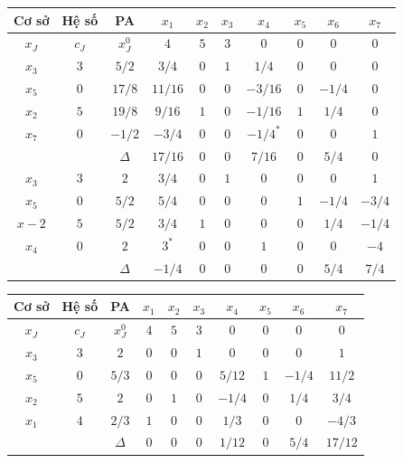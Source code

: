 \documentclass[12pt,a4paper]{report}
\begin{document}
    \begin{center}
        \begin{tabular}{|c|c|c|c|c|c|c|c|c|c|}
        \hline
         Cơ sở & Hệ số & PA& $x_1$ &$x_2$ &$x_3$ &$x_4$ &$x_5$ &$x_6$ &$x_7$ \\
         \hline
          $x_J$& $c_J$ &$x_J^0$ &$4$ &$5$ &$ 3$ &$0$ &$0$ &$0$ &$0$\\
          \hline
           $x_3$ &$3$ &$5/2$ &$3/4$ &$0$ &$1$ &$1/4$ &$0$ &$0$ &$0$\\
          $x_5$ &$0$ &$17/8$ &$11/16$ &$0$ &$0$ &$-3/16$ &$0$ &$-1/4$ &$0$\\
          $x_2$ &$5$ &$19/8$ &$9/16$ &$1$ &$0$ &$-1/16$ &$1$ &$1/4$ &$0$\\
          $x_7$ &$0$ &$-1/2$ &$-3/4$ &$0$ &$0$ &$-1/4^*$ &$0$ &$0$ &$1$\\
          \hline
          &&$\Delta$ &$17/16$ &$0$ &$0$ &$7/16$ &$0$ &$5/4$ &$0$\\
          \hline
          $x_3$ &$3$ &$2$ &$3/4$ &$0$ &$1$ &$0$ &$0$ &$0$ &$1$\\
          $x_5$ &$0$ &$5/2$ &$5/4$ &$0$ &$0$ &$0$ &$1$ &$-1/4$ &$-3/4$\\
          $x-2$ &$5$ &$5/2$ &$3/4$ &$1$ &$0$ &$0$ &$0$ &$1/4$ &$-1/4$\\
          $x_4$ &$0$ &$2$ &$3^*$ &$0$ &$0$ &$1$ &$0$ &$0$ &$-4$\\
          \hline
          &&$\Delta$&$-1/4$ &$0$ &$0$ &$0$ &$0$ &$5/4$ &$7/4$\\
          \hline
          \end{tabular}
    \end{center}    
    \begin{center}
        \begin{tabular}{|c|c|c|c|c|c|c|c|c|c|}
        \hline
          Cơ sở & Hệ số & PA& $x_1$ &$x_2$ &$x_3$ &$x_4$ &$x_5$ &$x_6$ &$x_7$ \\
         \hline
          $x_J$& $c_J$ &$x_J^0$ &$4$ &$5$ &$ 3$ &$0$ &$0$ &$0$ &$0$\\
          \hline
          $x_3$ &$3$ &$2$ &$0$ &$0$ &$1$ &$0$ &$0$ &$0$ &$1$\\
          $x_5$ &$0$ &$5/3$ &$0$ &$0$ &$0$ &$5/12$ &$1$ &$-1/4$ &$11/2$\\
          $x_2$ &$5$ &$2$ &$0$ &$1$ &$0$ &$-1/4$ &$0$ &$1/4$ &$3/4$\\
          $x_1$ &$4$ &$2/3$ &$1$ &$0$ &$0$ &$1/3$ &$0$ &$0$ &$-4/3$\\
          \hline
          &&$\Delta$ &$0$ &$0$ &$0$ &$1/12$ &$0$ &$5/4$ &$17/12$\\
          \hline
        \end{tabular}
    \end{center}
\end{document}
